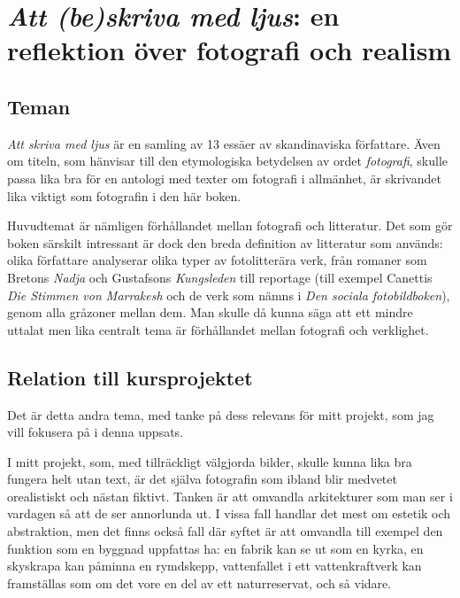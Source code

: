 \documentclass[
]{article}
\author{}
\date{}
\begin{document}
\hypertarget{att-beskriva-med-ljus-en-reflektion-uxf6ver-fotografi-och-realism}{%
\section{\texorpdfstring{\emph{Att (be)skriva med ljus}: en reflektion
över fotografi och
realism}{Att (be)skriva med ljus: en reflektion över fotografi och realism}}\label{att-beskriva-med-ljus-en-reflektion-uxf6ver-fotografi-och-realism}}

\hypertarget{teman}{%
\subsection{Teman}\label{teman}}

\emph{Att skriva med ljus} \cite{asml} är en samling av 13 essäer av skandinaviska
författare. Även om titeln, som hänvisar till den etymologiska
betydelsen av ordet \emph{fotografi}, skulle passa lika bra för en
antologi med texter om fotografi i allmänhet, är skrivandet lika viktigt
som fotografin i den här boken.

Huvudtemat är nämligen förhållandet mellan fotografi och litteratur. Det
som gör boken särskilt intressant är dock den breda definition av
litteratur som används: olika författare analyserar olika typer av
fotolitterära verk, från romaner som Bretons \emph{Nadja} och
Gustafsons \emph{Kungsleden} till reportage (till exempel Canettis
\emph{Die Stimmen von Marrakesh} och de verk som nämns i \emph{Den
sociala fotobildboken}), genom alla gråzoner mellan dem. Man skulle då
kunna säga att ett mindre uttalat men lika centralt tema är förhållandet
mellan fotografi och verklighet.

\hypertarget{relation-till-kursprojektet}{%
\subsection{Relation till
kursprojektet}\label{relation-till-kursprojektet}}

Det är detta andra tema, med tanke på dess relevans för mitt projekt,
som jag vill fokusera på i denna uppsats.

I mitt projekt, som, med tillräckligt välgjorda bilder, skulle kunna
lika bra fungera helt utan text, är det själva fotografin som ibland
blir medvetet orealistiskt och nästan fiktivt. Tanken är att omvandla
arkitekturer som man ser i vardagen så att de ser annorlunda ut. I vissa
fall handlar det mest om estetik och abstraktion, men det finns också
fall där syftet är att omvandla till exempel den funktion som en byggnad
uppfattas ha: en fabrik kan se ut som en kyrka, en skyskrapa kan påminna
en rymdskepp, vattenfallet i ett vattenkraftverk kan framställas som om
det vore en del av ett naturreservat, och så vidare.
\end{document}
